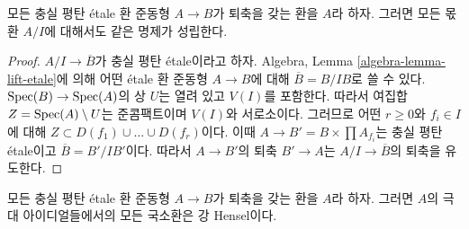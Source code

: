 \begin{lemma}
\label{lemma-have-sections-quotient}
모든 충실 평탄 \'etale 환 준동형 $A \to B$가 퇴축을 갖는 환을
$A$라 하자. 그러면 모든 몫환 $A/I$에 대해서도 같은 명제가 성립한다.
\end{lemma}

\begin{proof}
$A/I \to \overline{B}$가 충실 평탄 \'etale이라고 하자.
Algebra, Lemma \ref{algebra-lemma-lift-etale}에 의해 어떤 \'etale
환 준동형 $A \to B$에 대해 $\overline{B} = B/IB$로 쓸 수 있다.
$\mathop{\mathrm{Spec}}(B) \to \mathop{\mathrm{Spec}}(A)$의 상 $U$는 열려 있고 $V(I)$를 포함한다.
따라서 여집합 $Z = \mathop{\mathrm{Spec}}(A) \setminus U$는 준콤팩트이며
$V(I)$와 서로소이다. 그러므로 어떤 $r \geq 0$와 $f_i \in I$에 대해
$Z \subset D(f_1) \cup \ldots \cup D(f_r)$이다. 이때
$A \to B' = B \times \prod A_{f_i}$는 충실 평탄 \'etale이고
$\overline{B} = B'/IB'$이다.
따라서 $A \to B'$의 퇴축 $B' \to A$는
$A/I \to \overline{B}$의 퇴축을 유도한다.
\end{proof}

\begin{lemma}
\label{lemma-have-sections-strictly-henselian}
모든 충실 평탄 \'etale 환 준동형 $A \to B$가 퇴축을 갖는 환을
$A$라 하자. 그러면 $A$의 극대 아이디얼들에서의 모든 국소환은
강 Hensel이다.
\end{lemma}

